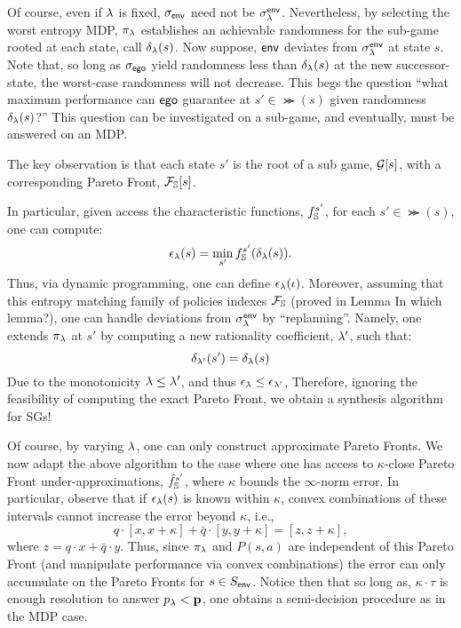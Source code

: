 Of course, even if $\lambda$ is fixed, ${\sigma_{\mathsf{env}}}$ need not be
$\sigma^{\mathsf{env}}_\lambda$. Nevertheless,  by selecting the worst
entropy MDP, $\pi_\lambda$ establishes an achievable randomness for the
sub-game rooted at each state, call $\delta_\lambda(s)$. Now suppose,
$\mathsf{env}$ deviates from $\sigma_\lambda^{\mathsf{env}}$ at state $s$. Note that, so
long as ${\sigma_{\mathsf{ego}}}$  yield randomness less than
$\delta_\lambda(s)$ at the new successor-state, the worst-case randomness will not decrease.
This begs the question ``what maximum performance can $\mathsf{ego}$ guarantee at $s' \in
\Succ(s)$ given randomness $\delta_\lambda(s)$?'' This question can be investigated on a sub-game, and eventually, must be answered on an MDP. 
\begin{mdframed}
  The key observation is that each state $s'$ is the root of a sub
  game, $\mathcal{G}[s]$, with a corresponding Pareto Front,
  $\mathcal{F}_{\mathbb{S}}[s]$.
\end{mdframed}
In particular, given access the characteristic functions,
$f_{\mathbb{S}}^{s'}$, for each $s' \in \Succ(s)$, one can compute:
\begin{equation}\label{eq:performance_lookup}
  \epsilon_\rat(s) = \min_{s'} f_\solutions^{s'}(\delta_\rat(s)).
\end{equation}
Thus, via dynamic programming, one can define $\epsilon_\lambda(\iota)$.
Moreover, assuming that this entropy matching family of policies
indexes $\mathcal{F}_{\mathbb{S}}$ (proved in Lemma {\color{red}In which lemma?}), one can handle
deviations from $\sigma^{\mathsf{env}}_\lambda$ by ``replanning''. Namely, one
extends $\pi_\lambda$ at $s'$ by computing a new rationality coefficient,
$\lambda'$, such that:
\begin{equation}
  \delta_{\lambda'}(s') = \delta_{\lambda}(s)
\end{equation}
Due to the monotonicity $\lambda \leq \lambda'$, and thus $\epsilon_\lambda \leq \epsilon_{\lambda'}$, 
Therefore, ignoring the feasibility of computing the exact Pareto
Front, we obtain a synthesis algorithm for SGs!

Of course, by varying $\lambda$, one can only construct approximate
Pareto Fronts. We now
adapt the above algorithm to the case where one has access to
$\kappa$-close Pareto Front under-approximations,
$\hat{f}_{\mathbb{S}}^{s'}$, where $\kappa$ bounds the $\infty$-norm
error. In particular, observe that if $\epsilon_\lambda(s)$ is known
within $\kappa$, convex combinations of these intervals cannot
increase the error beyond $\kappa$, i.e.,
\begin{equation}
  q\cdot[x, x + \kappa] + \bar{q}\cdot[y, y + \kappa] = [z, z + \kappa],
\end{equation}
where $z = q\cdot x + \bar{q}\cdot y$. Thus, since $\pi_\lambda$ and
$P(s, a)$ are independent of this Pareto Front (and manipulate
performance via convex combinations) the error can only accumulate on
the Pareto Fronts for $s \in S_{\mathsf{env}}$. Notice then that so long as,
$\kappa\cdot\tau$ is enough resolution to answer $p_\lambda <
\mathbf{p}$, one obtains a semi-decision procedure as in the MDP
case.

